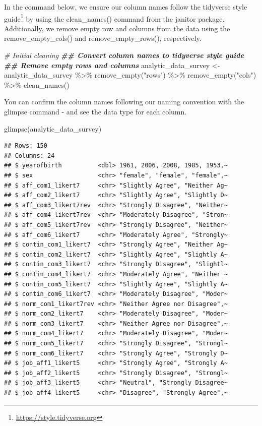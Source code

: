 \documentclass[
]{krantz}
\makeatletter
\newenvironment{Shaded}{\begin{snugshade}}{\end{snugshade}}
\newcommand{\CommentTok}[1]{\textcolor[rgb]{0.37,0.37,0.37}{\textit{#1}}}
\newcommand{\DocumentationTok}[1]{\textcolor[rgb]{0.37,0.37,0.37}{\textbf{\textit{#1}}}}
\newcommand{\FunctionTok}[1]{\textcolor[rgb]{0,0,0}{#1}}
\newcommand{\NormalTok}[1]{#1}
\newcommand{\OtherTok}[1]{\textcolor[rgb]{0.37,0.37,0.37}{#1}}
\newcommand{\SpecialCharTok}[1]{\textcolor[rgb]{0,0,0}{#1}}
\newcommand{\StringTok}[1]{\textcolor[rgb]{0.5,0.5,0.5}{#1}}
\renewcommand{\href}[2]{#2\footnote{\url{#1}}}
\newenvironment{kframe}{%
\medskip{}
\setlength{\fboxsep}{.8em}
 \def\at@end@of@kframe{}%
 \ifinner\ifhmode%
  \def\at@end@of@kframe{\end{minipage}}%
  \begin{minipage}{\columnwidth}%
 \fi\fi%
 \def\FrameCommand##1{\hskip\@totalleftmargin \hskip-\fboxsep
 \colorbox{shadecolor}{##1}\hskip-\fboxsep
     \hskip-\linewidth \hskip-\@totalleftmargin \hskip\columnwidth}%
 \MakeFramed {\advance\hsize-\width
   \@totalleftmargin\z@ \linewidth\hsize
   \@setminipage}}%
 {\par\unskip\endMakeFramed%
 \at@end@of@kframe}
\renewenvironment{Shaded}{\begin{kframe}}{\end{kframe}}
\makeatother
\begin{document}
In the command below, we ensure our column names follow the tidyverse \href{https://style.tidyverse.org}{style guide} by using the clean\_names() command from the janitor package. Additionally, we remove empty row and columns from the data using the remove\_empty\_cols() and remove\_empty\_rows(), respectively.

\begin{Shaded}
\begin{Highlighting}[]
\CommentTok{\# Initial cleaning}
\DocumentationTok{\#\# Convert column names to tidyverse style guide}
\DocumentationTok{\#\# Remove empty rows and columns}
\NormalTok{analytic\_data\_survey }\OtherTok{\textless{}{-}}\NormalTok{ analytic\_data\_survey }\SpecialCharTok{\%\textgreater{}\%}
  \FunctionTok{remove\_empty}\NormalTok{(}\StringTok{"rows"}\NormalTok{) }\SpecialCharTok{\%\textgreater{}\%}
  \FunctionTok{remove\_empty}\NormalTok{(}\StringTok{"cols"}\NormalTok{) }\SpecialCharTok{\%\textgreater{}\%}
  \FunctionTok{clean\_names}\NormalTok{()}
\end{Highlighting}
\end{Shaded}

You can confirm the column names following our naming convention with the glimpse command - and see the data type for each column.

\begin{Shaded}
\begin{Highlighting}[]
\FunctionTok{glimpse}\NormalTok{(analytic\_data\_survey)}
\end{Highlighting}
\end{Shaded}

\begin{verbatim}
## Rows: 150
## Columns: 24
## $ yearofbirth          <dbl> 1961, 2006, 2008, 1985, 1953,~
## $ sex                  <chr> "female", "female", "female",~
## $ aff_com1_likert7     <chr> "Slightly Agree", "Neither Ag~
## $ aff_com2_likert7     <chr> "Slightly Agree", "Slightly D~
## $ aff_com3_likert7rev  <chr> "Strongly Disagree", "Neither~
## $ aff_com4_likert7rev  <chr> "Moderately Disagree", "Stron~
## $ aff_com5_likert7rev  <chr> "Strongly Disagree", "Neither~
## $ aff_com6_likert7     <chr> "Moderately Agree", "Strongly~
## $ contin_com1_likert7  <chr> "Strongly Agree", "Neither Ag~
## $ contin_com2_likert7  <chr> "Slightly Agree", "Slightly A~
## $ contin_com3_likert7  <chr> "Strongly Disagree", "Slightl~
## $ contin_com4_likert7  <chr> "Moderately Agree", "Neither ~
## $ contin_com5_likert7  <chr> "Slightly Agree", "Slightly A~
## $ contin_com6_likert7  <chr> "Moderately Disagree", "Moder~
## $ norm_com1_likert7rev <chr> "Neither Agree nor Disagree",~
## $ norm_com2_likert7    <chr> "Moderately Disagree", "Moder~
## $ norm_com3_likert7    <chr> "Neither Agree nor Disagree",~
## $ norm_com4_likert7    <chr> "Moderately Disagree", "Moder~
## $ norm_com5_likert7    <chr> "Strongly Disagree", "Strongl~
## $ norm_com6_likert7    <chr> "Strongly Agree", "Strongly D~
## $ job_aff1_likert5     <chr> "Strongly Agree", "Strongly A~
## $ job_aff2_likert5     <chr> "Strongly Disagree", "Strongl~
## $ job_aff3_likert5     <chr> "Neutral", "Strongly Disagree~
## $ job_aff4_likert5     <chr> "Disagree", "Strongly Agree",~
\end{verbatim}
\end{document}
